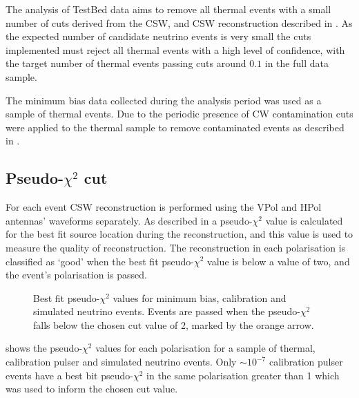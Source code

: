 The analysis of TestBed data aims to remove all thermal events with a small number of cuts derived from the CSW, and CSW reconstruction described in . As the expected number of candidate neutrino events is very small the cuts implemented must reject all thermal events with a high level of confidence, with the target number of thermal events passing cuts around $0.1$ in the full data sample.

The minimum bias data collected during the analysis period was used as a sample of thermal events. Due to the periodic presence of CW contamination cuts were applied to the thermal sample to remove contaminated events as described in . 

\subsection{Pseudo-$\chi^{2}$ cut}
\label{sec:Analysis:Thermal-Cuts:Pseudo-ChiSq}

For each event CSW reconstruction is performed using the VPol and HPol antennas' waveforms separately. As described in  a pseudo-$\chi^{2}$ value is calculated for the best fit source location during the reconstruction, and this value is used to measure the quality of reconstruction. The reconstruction in each polarisation is classified as `good' when the best fit pseudo-$\chi^{2}$ value is below a value of two, and the event's polarisation is passed.

\begin{figure}[htpb]
  \hfill
  \caption{Best fit pseudo-$\chi^{2}$ values for minimum bias, calibration and simulated neutrino events. Events are passed when the pseudo-$\chi^{2}$ falls below the chosen cut value of 2, marked by the orange arrow.}
  \label{fig:Analysis:Thermal-Cuts:Pseudo-ChiSq}
\end{figure}
  
 shows the pseudo-$\chi^{2}$ values for each polarisation for a sample of thermal, calibration pulser and simulated neutrino events. Only $\sim 10^{-7}$ calibration pulser events have a best bit pseudo-$\chi^{2}$ in the same polarisation greater than 1 which was used to inform the chosen cut value.

